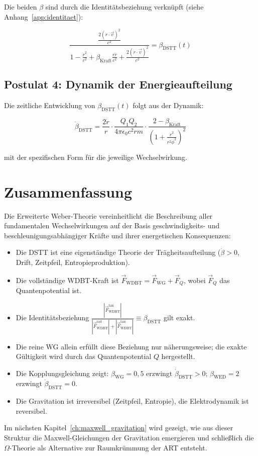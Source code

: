 Die beiden \(\beta\) sind durch die Identitätsbeziehung verknüpft (siehe Anhang~\ref{app:identitaet}):

\[
\frac{\frac{2(\dot{r} \cdot \vec{v})^2}{c^2}}{1 - \frac{\dot{r}^2}{c^2} + \beta_{\text{Kraft}} \frac{r \ddot{r}}{c^2} + \frac{2(\dot{r} \cdot \vec{v})^2}{c^2}} = \beta_{\text{DSTT}}(t)
\]

\subsection{Postulat 4: Dynamik der Energieaufteilung}
\label{sec:postulat4}

Die zeitliche Entwicklung von \(\beta_{\text{DSTT}}(t)\) folgt aus der Dynamik:

\[
\dot{\beta}_{\text{DSTT}} = \frac{2\dot{r}}{r} \cdot \frac{Q_1 Q_2}{4\pi \epsilon_0 c^2 r m} \cdot \frac{2 - \beta_{\text{Kraft}}}{\left(1 + \frac{\dot{r}^2}{r^2 \dot{\phi}^2}\right)^2}
\]

mit der spezifischen Form für die jeweilige Wechselwirkung.

\section{Zusammenfassung}
\label{sec:dstt_zusammenfassung}

Die Erweiterte Weber-Theorie vereinheitlicht die Beschreibung aller fundamentalen Wechselwirkungen auf der Basis geschwindigkeits- und beschleunigungsabhängiger Kräfte und ihrer energetischen Konsequenzen:

\begin{itemize}
    \item Die DSTT ist eine eigenständige Theorie der Trägheitsaufteilung (\(\dot{\beta} > 0\), Drift, Zeitpfeil, Entropieproduktion).
    \item Die vollständige WDBT-Kraft ist \(\vec{F}_{\text{WDBT}} = \vec{F}_{\text{WG}} + \vec{F}_Q\), wobei \(\vec{F}_Q\) das Quantenpotential ist.
    \item Die Identitätsbeziehung \(\displaystyle \frac{|\vec{F}_{\text{WDBT}}^{\text{tan}}|}{|\vec{F}_{\text{WDBT}}^{\text{rad}}| + |\vec{F}_{\text{WDBT}}^{\text{tan}}|} \equiv \beta_{\text{DSTT}}\) gilt exakt.
    \item Die reine WG allein erfüllt diese Beziehung nur näherungsweise; die exakte Gültigkeit wird durch das Quantenpotential \(Q\) hergestellt.
    \item Die Kopplungsgleichung zeigt: \(\beta_{\text{WG}} = 0,5\) erzwingt \(\dot{\beta}_{\text{DSTT}} > 0\); \(\beta_{\text{WED}} = 2\) erzwingt \(\dot{\beta}_{\text{DSTT}} = 0\).
    \item Die Gravitation ist irreversibel (Zeitpfeil, Entropie), die Elektrodynamik ist reversibel.
\end{itemize}

Im nächsten Kapitel~\ref{ch:maxwell_gravitation} wird gezeigt, wie aus dieser Struktur die Maxwell-Gleichungen der Gravitation emergieren und schließlich die \(\Omega\)-Theorie als Alternative zur Raumkrümmung der ART entsteht.